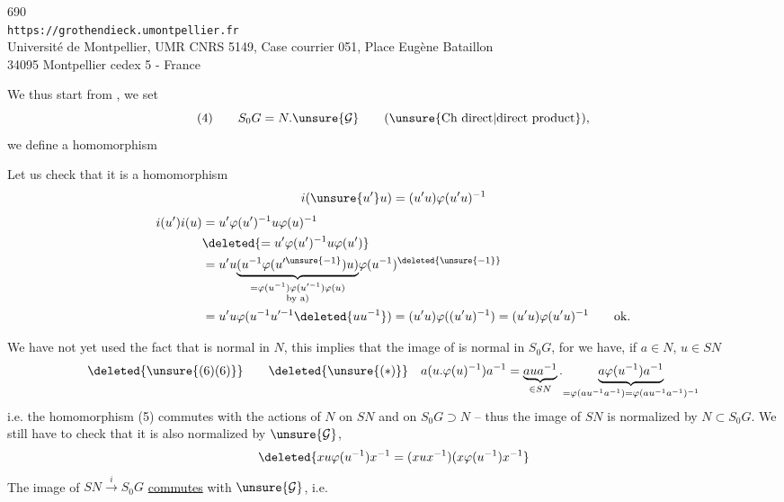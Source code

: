 
\begin{center}
690\\
\texttt{https://grothendieck.umontpellier.fr}\\
Université de Montpellier, UMR CNRS 5149, Case courrier 051, Place Eugène Bataillon\\
34095 Montpellier cedex 5 - France
\end{center}



We thus start from , we set
\[
 (4)\qquad S_0G=N.\unsure{\mathcal G}\qquad(\text{\unsure{Ch direct|direct product}}),
\]
we define a homomorphism


Let us check that it is a homomorphism
\[
 i(\unsure{u'}u)=(u'u)\varphi(u'u)^{-1}
\]
\[
\begin{aligned}
 i(u')i(u)&=u'\varphi(u')^{-1}u\varphi(u)^{-1}\\
 &\deleted{=u'\varphi(u')^{-1}u\varphi(u')}\\
 &=u'u\underset{\substack{=\varphi(u^{-1})\varphi(u'^{-1})\varphi(u)\\\text{by a)}}}{\underbrace{(u^{-1}\varphi(u'^{\unsure{-1}})u)}}\varphi(u^{-1})^{\deleted{\unsure{-1}}}\\
 &=u'u\varphi(u^{-1}u'^{-1}\deleted{uu^{-1}})=(u'u)\varphi((u'u)^{-1})=(u'u)\varphi(u'u)^{-1}\qquad\text{ok.}
\end{aligned}
\]

We have not yet used the fact that is normal in $N$,  this implies that the image of  is normal in $S_0G$, for  we have, if $a\in N$, $u\in SN$
\[
 \deleted{\unsure{(6)(6)}}\qquad\deleted{\unsure{(*)}}\quad
 a(u.\varphi(u)^{-1})a^{-1}
 =\underbrace{aua^{-1}}_{\in SN}.\underset{=\varphi(au^{-1}a^{-1})=\varphi(au^{-1}a^{-1})^{-1}}{\underbrace{a\varphi(u^{-1})a^{-1}}}
\]
i.e. the homomorphism (5)  commutes with the actions of $N$ on $SN$ and on $S_0G\supset N$ -- thus the image of $SN$ is normalized by $N\subset S_0G$. We still have to check that it is also normalized by $\unsure{\mathcal G}$, 
\[
 \deleted{xu\varphi(u^{-1})x^{-1}=(xux^{-1})(x\varphi(u^{-1})x^{-1}}
\]
The image of $SN\xrightarrow{i}S_0G$ \uline{commutes} with $\unsure{\mathcal G}$, i.e.

